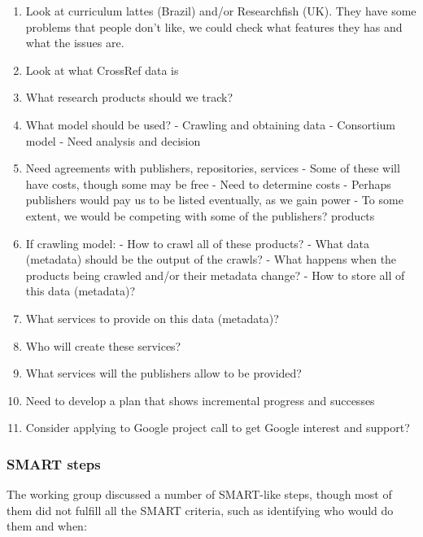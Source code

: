 \begin{enumerate}
\item Look at curriculum lattes (Brazil) and/or Researchfish (UK).  They have some problems that people don't like, we could check what features they has and what the issues are.

\item Look at what CrossRef data is

\item What research products should we track?

\item What model should be used?
- Crawling and obtaining data
- Consortium model
- Need analysis and decision

\item Need agreements with publishers, repositories, services
- Some of these will have costs, though some may be free
- Need to determine costs
- Perhaps publishers would pay us to be listed eventually, as we gain power
- To some extent, we would be competing with some of the publishers? products

\item If crawling model:
- How to crawl all of these products?
- What data (metadata) should be the output of the crawls?
    - What happens when the products being crawled and/or their metadata change?
- How to store all of this data (metadata)?

\item What services to provide on this data (metadata)?

\item Who will create these services?

\item What services will the publishers allow to be provided?

\item Need to develop a plan that shows incremental progress and successes

\item Consider applying to Google project call to get Google interest and support?
\end{enumerate}


\subsubsection{SMART steps}

The working group discussed a number of SMART-like steps, though most of them did not fulfill all the SMART criteria, such as identifying who would do them and when:

